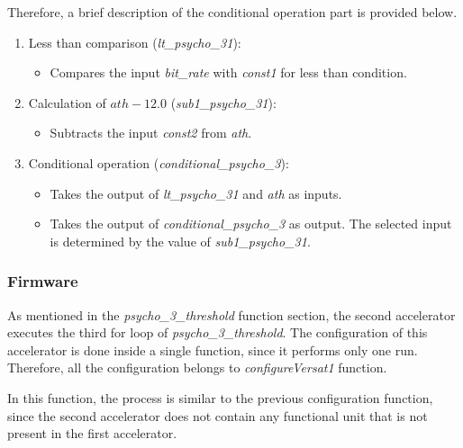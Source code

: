 Therefore, a brief description of the conditional operation part is provided below.

\begin{enumerate}

\item Less than comparison (\textit{lt\_psycho\_31}):
\begin{itemize}
\item Compares the input \textit{bit\_rate} with \textit{const1} for less than condition.
\end{itemize}

\item Calculation of $ath - 12.0$ (\textit{sub1\_psycho\_31}):
\begin{itemize}
\item Subtracts the input \textit{const2} from \textit{ath}.
\end{itemize}

\item Conditional operation (\textit{conditional\_psycho\_3}):
\begin{itemize}
\item Takes the output of \textit{lt\_psycho\_31} and \textit{ath} as inputs.
\item Takes the output of \textit{conditional\_psycho\_3} as output. The selected input is determined by the value of \textit{sub1\_psycho\_31}.

\end{itemize}

\end{enumerate}

\subsubsection{Firmware}

As mentioned in the \textit{psycho\_3\_threshold} function section, the second accelerator executes the third for loop of \textit{psycho\_3\_threshold}.
The configuration of this accelerator is done inside a single function, since it performs only one run. Therefore, all the configuration belongs to \textit{configureVersat1} function.

In this function, the process is similar to the previous configuration function, since the second accelerator does not contain any functional unit that is not present in the first accelerator.